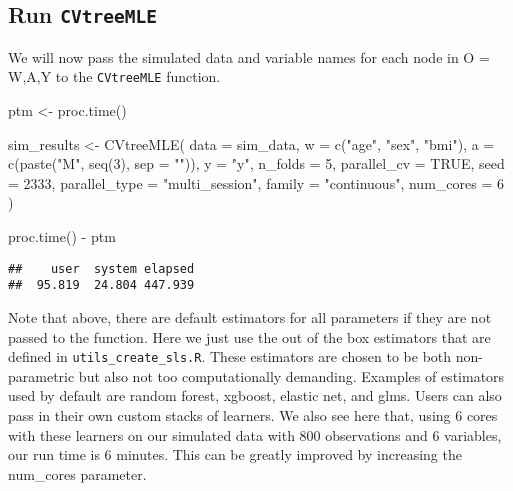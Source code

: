 \documentclass[
]{article}
\newenvironment{Shaded}{\begin{snugshade}}{\end{snugshade}}
\newcommand{\AttributeTok}[1]{\textcolor[rgb]{0.77,0.63,0.00}{#1}}
\newcommand{\ConstantTok}[1]{\textcolor[rgb]{0.00,0.00,0.00}{#1}}
\newcommand{\DecValTok}[1]{\textcolor[rgb]{0.00,0.00,0.81}{#1}}
\newcommand{\FunctionTok}[1]{\textcolor[rgb]{0.00,0.00,0.00}{#1}}
\newcommand{\NormalTok}[1]{#1}
\newcommand{\OtherTok}[1]{\textcolor[rgb]{0.56,0.35,0.01}{#1}}
\newcommand{\SpecialCharTok}[1]{\textcolor[rgb]{0.00,0.00,0.00}{#1}}
\newcommand{\StringTok}[1]{\textcolor[rgb]{0.31,0.60,0.02}{#1}}
\begin{document}
\hypertarget{run-cvtreemle}{%
\subsection{\texorpdfstring{Run
\texttt{CVtreeMLE}}{Run CVtreeMLE}}\label{run-cvtreemle}}

We will now pass the simulated data and variable names for each node in
O = W,A,Y to the \texttt{CVtreeMLE} function.

\begin{Shaded}
\begin{Highlighting}[]
\NormalTok{ptm }\OtherTok{\textless{}{-}} \FunctionTok{proc.time}\NormalTok{()}

\NormalTok{sim\_results }\OtherTok{\textless{}{-}} \FunctionTok{CVtreeMLE}\NormalTok{(}
  \AttributeTok{data =}\NormalTok{ sim\_data,}
  \AttributeTok{w =} \FunctionTok{c}\NormalTok{(}\StringTok{"age"}\NormalTok{, }\StringTok{"sex"}\NormalTok{, }\StringTok{"bmi"}\NormalTok{),}
  \AttributeTok{a =} \FunctionTok{c}\NormalTok{(}\FunctionTok{paste}\NormalTok{(}\StringTok{"M"}\NormalTok{, }\FunctionTok{seq}\NormalTok{(}\DecValTok{3}\NormalTok{), }\AttributeTok{sep =} \StringTok{""}\NormalTok{)),}
  \AttributeTok{y =} \StringTok{"y"}\NormalTok{,}
  \AttributeTok{n\_folds =} \DecValTok{5}\NormalTok{,}
  \AttributeTok{parallel\_cv =} \ConstantTok{TRUE}\NormalTok{,}
  \AttributeTok{seed =} \DecValTok{2333}\NormalTok{,}
  \AttributeTok{parallel\_type =} \StringTok{"multi\_session"}\NormalTok{,}
  \AttributeTok{family =} \StringTok{"continuous"}\NormalTok{,}
  \AttributeTok{num\_cores =} \DecValTok{6}
\NormalTok{)}

\FunctionTok{proc.time}\NormalTok{() }\SpecialCharTok{{-}}\NormalTok{ ptm}
\end{Highlighting}
\end{Shaded}

\begin{verbatim}
##    user  system elapsed 
##  95.819  24.804 447.939
\end{verbatim}

Note that above, there are default estimators for all parameters if they
are not passed to the function. Here we just use the out of the box
estimators that are defined in \texttt{utils\_create\_sls.R}. These
estimators are chosen to be both non-parametric but also not too
computationally demanding. Examples of estimators used by default are
random forest, xgboost, elastic net, and glms. Users can also pass in
their own custom stacks of learners. We also see here that, using 6
cores with these learners on our simulated data with 800 observations
and 6 variables, our run time is 6 minutes. This can be greatly improved
by increasing the num\_cores parameter.
\end{document}
